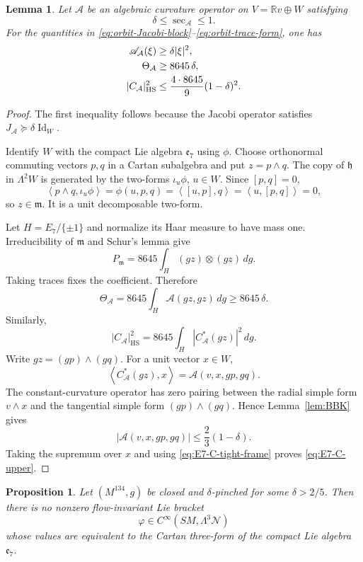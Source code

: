 \documentclass[reqno,11pt]{amsart}
\newtheorem{proposition}[theorem]{Proposition}
\newtheorem{lemma}[theorem]{Lemma}
\theoremstyle{definition}
\newcommand{\SM}{SM}
\newcommand{\cN}{\mathcal N}
\newcommand{\cA}{\mathcal A}
\newcommand{\Id}{\operatorname{Id}}
\newcommand{\bbR}{\mathbb R}
\newcommand{\inner}[2]{\left\langle #1,#2\right\rangle}
\begin{document}
\begin{lemma}
\label{lem:E7-tight-frame}
Let $\cA$ be an algebraic curvature operator on $V=\bbR v\oplus W$ satisfying
$$
 \delta\leq\sec_{\cA}\leq1.
$$
For the quantities in
\eqref{eq:orbit-Jacobi-block}--\eqref{eq:orbit-trace-form}, one has
\begin{align}
 \mathscr A_{\cA}(\xi)&\geq\delta|\xi|^2,
 \notag\\
 \Theta_{\cA}&\geq8645\,\delta,
 \notag\\
 |C_{\cA}|_{\mathrm{HS}}^2
 &\leq\frac{4\cdot8645}{9}(1-\delta)^2.
 \label{eq:E7-C-upper}
\end{align}
\end{lemma}

\begin{proof}
The first inequality follows because the Jacobi operator satisfies
$J_{\cA}\succeq\delta\Id_W$.

Identify $W$ with the compact Lie algebra $\mathfrak e_7$ using $\phi$.
Choose orthonormal commuting vectors $p,q$ in a Cartan subalgebra and put
$z=p\wedge q$.  The copy of $\mathfrak h$ in $\Lambda^2W$ is generated by
the two-forms $\iota_u\phi$, $u\in W$.  Since $[p,q]=0$,
$$
 \inner{p\wedge q}{\iota_u\phi}
 =\phi(u,p,q)=\inner{[u,p]}q
 =\inner{u}{[p,q]}=0,
$$
so $z\in\mathfrak m$.  It is a unit decomposable two-form.

Let $H=E_7/\{\pm1\}$ and normalize its Haar measure to have mass one.
Irreducibility of $\mathfrak m$ and Schur's lemma give
\begin{equation*}
 P_{\mathfrak m}
 =8645\int_H(gz)\otimes(gz)\,dg.
\end{equation*}
Taking traces fixes the coefficient.  Therefore
$$
 \Theta_{\cA}
 =8645\int_H\cA(gz,gz)\,dg
 \geq8645\,\delta.
$$
Similarly,
\begin{equation}\label{eq:E7-C-tight-frame}
 |C_{\cA}|_{\mathrm{HS}}^2
 =8645\int_H|C_{\cA}^*(gz)|^2\,dg.
\end{equation}
Write $gz=(gp)\wedge(gq)$.  For a unit vector $x\in W$,
$$
 \inner{C_{\cA}^*(gz)}{x}=\cA(v,x,gp,gq).
$$
The constant-curvature operator has zero pairing between the radial simple
form $v\wedge x$ and the tangential simple form $(gp)\wedge(gq)$.  Hence
Lemma~\ref{lem:BBK} gives
$$
 |\cA(v,x,gp,gq)|\leq\frac23(1-\delta).
$$
Taking the supremum over $x$ and using
\eqref{eq:E7-C-tight-frame} proves \eqref{eq:E7-C-upper}.
\end{proof}

\begin{proposition}
\label{prop:E7-vanishing}
Let $(M^{134},g)$ be closed and $\delta$-pinched for some
$\delta>2/5$.  Then there is no nonzero flow-invariant Lie bracket
$$
 \varphi\in C^\infty(\SM,\Lambda^3\cN)
$$
whose values are equivalent to the Cartan three-form of the compact Lie
algebra $\mathfrak e_7$.
\end{proposition}
\end{document}
